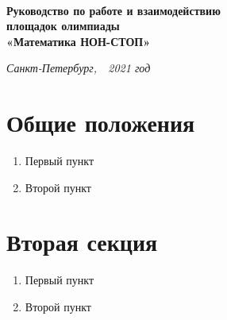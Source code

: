 \documentclass[a4paper,12pt]{article}
\newcommand{\mns}{«Математика НОН-СТОП»\xspace}
\begin{document}
\begin{center} {\LARGE\bf \ \\
	Руководство по работе и взаимодействию \\
	площадок олимпиады \\
	\mns \\}
\end{center}

\begin{flushright} {\it
	Санкт-Петербург,\ \ 2021 год}
\end{flushright}

\section{Общие положения}

\begin{enumerate}
	\item Первый пункт
	\item Второй пункт
\end{enumerate}

\section{Вторая секция}

\begin{enumerate}
	\item Первый пункт
	\item Второй пункт
\end{enumerate}
\end{document}
